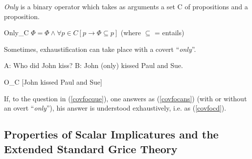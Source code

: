 \documentclass[a4paper,11pt]{article}
\newcommand{\reff}[1]{(\ref{#1})}
\newcommand{\exs}[2][]{\begin{exe}\ex #1 \begin{xlist}#2\end{xlist}\end{exe}}
\begin{document}
\emph{Only} is a binary operator which takes as arguments a set C of propositions and a proposition.

  \begin{exe}
    \ex\label{semonly} Only_C $\Phi=\Phi \wedge \forall p \in C [p\rightarrow \Phi \subseteq p] $ (where $\subseteq$ = entails)
  \end{exe}

Sometimes, exhaustification can take place with a covert \enquote{\emph{only}}.

\exs{
  \ex\label{covfoca}
    \begin{xlist}
      \ex\label{covfocque} A: Who did John kiss?
      \ex\label{covfocans} B: John (only) kissed Paul and Sue.
    \end{xlist}
  \ex\label{covfocd} O_C [John kissed Paul and Sue]
}
%
If, to the question in \reff{covfocque}, one answers as \reff{covfocans} (with or without an overt \enquote{\emph{only}}), his answer is understood exhaustively, i.e. as \reff{covfocd}.


\subsection{Properties of Scalar Implicatures and the Extended Standard Grice Theory}
\end{document}
